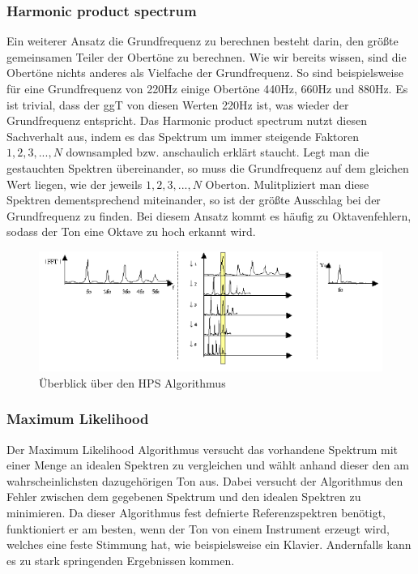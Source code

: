 \subsubsection*{Harmonic product spectrum}
Ein weiterer Ansatz die Grundfrequenz zu berechnen besteht darin, den größte gemeinsamen Teiler der Obertöne zu berechnen. Wie wir bereits wissen, sind die Obertöne nichts anderes als Vielfache der Grundfrequenz. So sind beispielsweise für eine Grundfrequenz von 220Hz einige Obertöne 440Hz, 660Hz und 880Hz. Es ist trivial, dass der ggT von diesen Werten 220Hz ist, was wieder der Grundfrequenz entspricht. Das Harmonic product spectrum nutzt diesen Sachverhalt aus, indem es das Spektrum um immer steigende Faktoren $1,2,3,...,N$ downsampled bzw. anschaulich erklärt staucht. Legt man die gestauchten Spektren übereinander, so muss die Grundfrequenz auf dem gleichen Wert liegen, wie der jeweils $1,2,3,...,N$ Oberton. Mulitpliziert man diese Spektren dementsprechend miteinander, so ist der größte Ausschlag bei der Grundfrequenz zu finden. Bei diesem Ansatz kommt es häufig zu Oktavenfehlern, sodass der Ton eine Oktave zu hoch erkannt wird. \cite{cuadra2001hps}
\begin{figure}[H]
    \centering
    \includegraphics[width=1\textwidth]{Bilder/hps_algo.png}
    \caption{Überblick über den HPS Algorithmus \cite{cuadra2001hps}}
    \label{sec:hps_algo}
\end{figure}

\subsubsection*{Maximum Likelihood}
Der Maximum Likelihood Algorithmus versucht das vorhandene Spektrum mit einer Menge an idealen Spektren zu vergleichen und wählt anhand dieser den am wahrscheinlichsten dazugehörigen Ton aus. Dabei versucht der Algorithmus den Fehler zwischen dem gegebenen Spektrum und den idealen Spektren zu minimieren. Da dieser Algorithmus fest defnierte Referenzspektren benötigt, funktioniert er am besten, wenn der Ton von einem Instrument erzeugt wird, welches eine feste Stimmung hat, wie beispielsweise ein Klavier. Andernfalls kann es zu stark springenden Ergebnissen kommen. \cite{cuadra2001hps}

